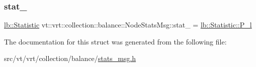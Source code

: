 \subsubsection{\texorpdfstring{stat\+\_\+}{stat\_}}
{\footnotesize\ttfamily \hyperlink{namespacevt_1_1vrt_1_1collection_1_1lb_af0e20ef9afee77295053aa83bf1348b1}{lb\+::\+Statistic} vt\+::vrt\+::collection\+::balance\+::\+Node\+Stats\+Msg\+::stat\+\_\+ = \hyperlink{namespacevt_1_1vrt_1_1collection_1_1lb_af0e20ef9afee77295053aa83bf1348b1af76181d80de89c5736a21709e19caa61}{lb\+::\+Statistic\+::\+P\+\_\+l}}



The documentation for this struct was generated from the following file\+:\begin{DoxyCompactItemize}
\item 
src/vt/vrt/collection/balance/\hyperlink{stats__msg_8h}{stats\+\_\+msg.\+h}\end{DoxyCompactItemize}
